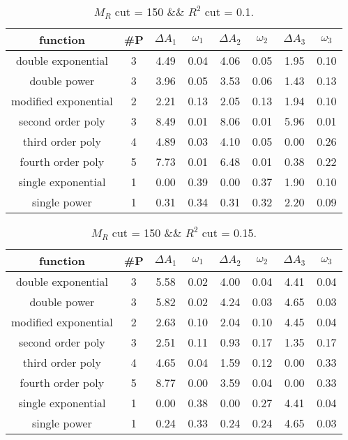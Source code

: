  
\begin{table}[H] 
\begin{center} 
\begin{tabular}{|c|c|cc|cc|cc|} 
\hline function & \#P & $\Delta A_1$ & $\omega_1$ & $\Delta A_2$ & $\omega_2$ & $\Delta A_3$ & $\omega_3$ \\ \hline 
double exponential &  3 &   4.49 &   0.04 &   4.06 &   0.05 &   1.95 &   0.10 \\ 
double power &  3 &   3.96 &   0.05 &   3.53 &   0.06 &   1.43 &   0.13 \\ 
modified exponential &  2 &   2.21 &   0.13 &   2.05 &   0.13 &   1.94 &   0.10 \\ 
second order poly &  3 &   8.49 &   0.01 &   8.06 &   0.01 &   5.96 &   0.01 \\ 
third order poly &  4 &   4.89 &   0.03 &   4.10 &   0.05 &   0.00 &   0.26 \\ 
fourth order poly &  5 &   7.73 &   0.01 &   6.48 &   0.01 &   0.38 &   0.22 \\ 
single exponential &  1 &   0.00 &   0.39 &   0.00 &   0.37 &   1.90 &   0.10 \\ 
single power &  1 &   0.31 &   0.34 &   0.31 &   0.32 &   2.20 &   0.09 \\ 
\hline 
\end{tabular} 
\caption{$M_R$ cut = 150 \&\& $R^2$ cut = 0.1.} 
\label{tab:FitChoices_150_0.1} 
\end{center} 
\end{table} 
 
 
\begin{table}[H] 
\begin{center} 
\begin{tabular}{|c|c|cc|cc|cc|} 
\hline function & \#P & $\Delta A_1$ & $\omega_1$ & $\Delta A_2$ & $\omega_2$ & $\Delta A_3$ & $\omega_3$ \\ \hline 
double exponential &  3 &   5.58 &   0.02 &   4.00 &   0.04 &   4.41 &   0.04 \\ 
double power &  3 &   5.82 &   0.02 &   4.24 &   0.03 &   4.65 &   0.03 \\ 
modified exponential &  2 &   2.63 &   0.10 &   2.04 &   0.10 &   4.45 &   0.04 \\ 
second order poly &  3 &   2.51 &   0.11 &   0.93 &   0.17 &   1.35 &   0.17 \\ 
third order poly &  4 &   4.65 &   0.04 &   1.59 &   0.12 &   0.00 &   0.33 \\ 
fourth order poly &  5 &   8.77 &   0.00 &   3.59 &   0.04 &   0.00 &   0.33 \\ 
single exponential &  1 &   0.00 &   0.38 &   0.00 &   0.27 &   4.41 &   0.04 \\ 
single power &  1 &   0.24 &   0.33 &   0.24 &   0.24 &   4.65 &   0.03 \\ 
\hline 
\end{tabular} 
\caption{$M_R$ cut = 150 \&\& $R^2$ cut = 0.15.} 
\label{tab:FitChoices_150_0.15} 
\end{center} 
\end{table} 
 
 
